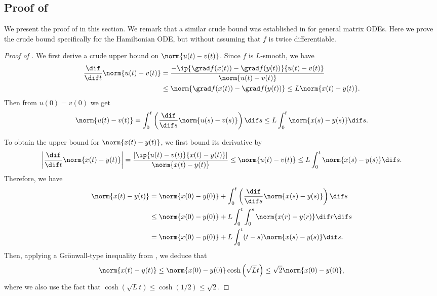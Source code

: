 \subsection{Proof of }
\label{subsec:proof_claim}
%
We present the proof of  in this section. We remark that a similar crude bound was established in \cite{LSV18} for general matrix ODEs. Here we prove the crude bound specifically for the Hamiltonian ODE, but without assuming that $f$ is twice differentiable.
\begin{proof}[Proof of ]
	We first derive a crude upper bound on $\norm{u(t)-v(t)}$. Since $f$ is $L$-smooth, we have 
	\begin{align*}
		\frac{\dif}{\dif t} \norm{u(t)-v(t)} 
		&= \frac{- \ip{\grad f(x(t)) - \grad f(y(t))}{u(t)-v(t)}}{\norm{u(t)-v(t)}}\\
		&\le \norm{\grad f(x(t)) - \grad f(y(t))} 
		\le L \norm{x(t)-y(t)}.
	\end{align*}
	Then from $u(0) = v(0)$ we get
	\[
	\norm{u(t)-v(t)} = \int_{0}^t \left( \frac{\dif}{\dif s} \norm{u(s)-v(s)} \right) \dif s \le L \int_{0}^t \norm{x(s)-y(s)} \dif s.
	\]
	
	To obtain the upper bound for $\norm{x(t)-y(t)}$, we first bound its derivative by
	\begin{equation}\label{eqn:abs_deri_x-y}
	\left| \frac{\dif}{\dif t} \norm{x(t)-y(t)} \right| = \frac{\left| \ip{u(t)-v(t)}{x(t)-y(t)} \right|}{\norm{x(t)-y(t)}} \le \norm{u(t)-v(t)} \le L \int_{0}^t \norm{x(s)-y(s)} \dif s.
	\end{equation}
	Therefore, we have
	\begin{align*}
		\norm{x(t)-y(t)} &= \norm{x(0) - y(0)} + \int_{0}^t \left( \frac{\dif}{\dif s} \norm{x(s)-y(s)} \right) \dif s\\ 
		&\le \norm{x(0) - y(0)} + L \int_{0}^t \int_{0}^s \norm{x(r)-y(r)} \dif r \dif s\\
		&= \norm{x(0) - y(0)} + L \int_{0}^t (t-s) \norm{x(s)-y(s)} \dif s.
	\end{align*}
	Then, applying a Gr\"{o}nwall-type inequality from \cite[Lemma A.5]{LSV18}, we deduce that
	\begin{equation}\label{eqn:upper_norm_x-y}
	\norm{x(t)-y(t)} \le \norm{x(0) - y(0)} \cosh\left( \sqrt{L}t \right) \le \sqrt{2} \norm{x(0) - y(0)},
	\end{equation}
	where we also use the fact that $\cosh(\sqrt{L} t) \leq \cosh(1/2) \le \sqrt{2}$.
	

\end{proof}
